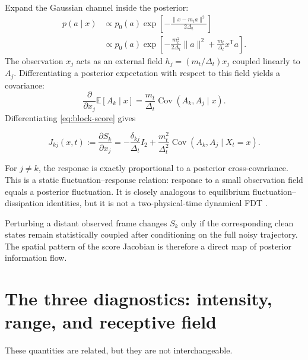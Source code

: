 \documentclass[11pt,a4paper]{article}
\newcommand{\E}{\mathbb{E}}
\newcommand{\Cov}{\operatorname{Cov}}
\begin{document}
Expand the Gaussian channel inside the posterior:
\begin{align}
 p(a\mid x)
 &\propto p_0(a)
 \exp\left[-\frac{\|x-m_ta\|^2}{2\Delta_t}\right]\\
 &\propto p_0(a)
 \exp\left[-\frac{m_t^2}{2\Delta_t}\|a\|^2
 +\frac{m_t}{\Delta_t}x^\mathsf{T}a\right].
 \label{eq:posterior-gibbs}
\end{align}
The observation $x_j$ acts as an external field $h_j=(m_t/\Delta_t)x_j$ coupled linearly to $A_j$. Differentiating a posterior expectation with respect to this field yields a covariance:
\begin{equation}
 \frac{\partial}{\partial x_j}\E[A_k\mid x]
 =\frac{m_t}{\Delta_t}\Cov(A_k,A_j\mid x).
 \label{eq:mean-response}
\end{equation}
Differentiating \cref{eq:block-score} gives
\begin{keyresult}
\begin{equation}
 \boxed{
 J_{kj}(x,t):=\frac{\partial S_k}{\partial x_j}
 =-\frac{\delta_{kj}}{\Delta_t}I_2
 +\frac{m_t^2}{\Delta_t^2}\Cov(A_k,A_j\mid X_t=x).}
 \label{eq:fdt}
\end{equation}
\end{keyresult}
For $j\ne k$, the response is exactly proportional to a posterior cross-covariance. This is a static fluctuation--response relation: response to a small observation field equals a posterior fluctuation. It is closely analogous to equilibrium fluctuation--dissipation identities, but it is not a two-physical-time dynamical FDT \cite{mezardmontanari,krzakala}.

\begin{intuition}
Perturbing a distant observed frame changes $S_k$ only if the corresponding clean states remain statistically coupled after conditioning on the full noisy trajectory. The spatial pattern of the score Jacobian is therefore a direct map of posterior information flow.
\end{intuition}

\section{The three diagnostics: intensity, range, and receptive field}

These quantities are related, but they are not interchangeable.
\end{document}
